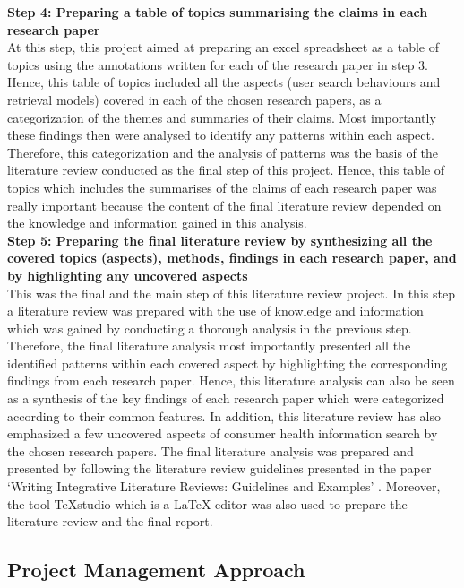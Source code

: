 \documentclass[]{article}
\begin{document}
\textbf{Step 4: Preparing a table of topics summarising the claims in each research paper}\\
	
At this step, this project aimed at preparing an excel spreadsheet as a table of topics using the annotations written for each of the research paper in step 3. Hence, this table of topics included all the aspects (user search behaviours and retrieval models) covered in each of the chosen research papers, as a categorization of the themes and summaries of their claims. Most importantly these findings then were analysed to identify any patterns within each aspect. Therefore, this categorization and the analysis of patterns was the basis of the literature review conducted as the final step of this project.  Hence, this table of topics which includes the summarises of the claims of each research paper was really important because the content of the final literature review depended on the knowledge and information gained in this analysis.\\ 
	
\textbf{Step 5: Preparing the final literature review by synthesizing all the covered topics (aspects), methods, findings in each research paper, and by highlighting any uncovered aspects}\\
	
This was the final and the main step of this literature review project. In this step a literature review was prepared with the use of knowledge and information which was gained by conducting a thorough analysis in the previous step. Therefore, the final literature analysis most importantly presented all the identified patterns within each covered aspect by highlighting the corresponding findings from each research paper. Hence, this literature analysis can also be seen as a synthesis of the key findings of each research paper which were categorized according to their common features. In addition, this literature review has also emphasized a few uncovered aspects of consumer health information search by the chosen research papers. The final literature analysis was prepared and presented by following the literature review guidelines presented in the paper ‘Writing Integrative Literature Reviews: Guidelines and Examples' \cite{torraco2005writing}. Moreover, the tool TeXstudio which is a LaTeX editor was also used to prepare the literature review and the final report. \\
	
\subsection{Project Management Approach} 
	
\end{document}
